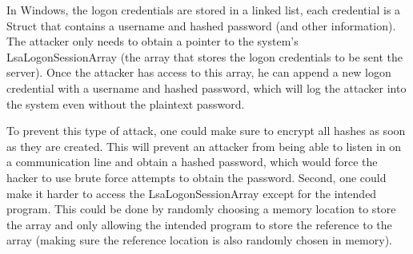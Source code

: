 \documentclass[psamsfonts]{amsart}
\begin{document}
In Windows, the logon credentials are stored in a linked list, each credential is a Struct that contains a username and hashed password (and other information). The attacker only needs to obtain a pointer to the system's LsaLogonSessionArray (the array that stores the logon credentials to be sent the server). Once the attacker has access to this array, he can append a new logon credential with a username and hashed password, which will log the attacker into the system even without the plaintext password.

To prevent this type of attack, one could make sure to encrypt all hashes as soon as they are created. This will prevent an attacker from being able to listen in on a communication line and obtain a hashed password, which would force the hacker to use brute force attempts to obtain the password. Second, one could make it harder to access the LsaLogonSessionArray except for the intended program. This could be done by randomly choosing a memory location to store the array and only allowing the intended program to store the reference to the array (making sure the reference location is also randomly chosen in memory).
\end{document}
